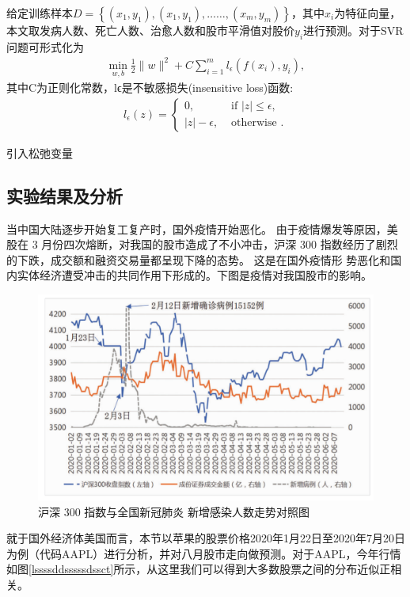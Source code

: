 \documentclass{whutmod}
\begin{document}
		给定训练样本$D=\left\{\left(x_{1}, y_{1}\right),\left(x_{1}, y_{1}\right), \ldots \ldots,\left(x_{m}, y_{m}\right)\right\}
		$，其中$x_i$为特征向量，本文取发病人数、死亡人数、治愈人数和股市平滑值对股价$y_i$进行预测。对于SVR问题可形式化为
				\begin{gather}
\min _{w, b} \frac{1}{2}\|w\|^{2}+C \sum_{i=1}^{m} l_{\epsilon}\left(f\left(x_{i}\right), y_{i}\right),
		\end{gather}
		其中C为正则化常数，lϵ是不敏感损失(insensitive loss)函数:
				\begin{gather*}
l_{\epsilon}(z)=\left\{\begin{array}{cc}
0, & \text { if }|z| \leq \epsilon ,\\
|z|-\epsilon, & \text { otherwise }.
\end{array}\right.
\end{gather*}

引入松弛变量
        \subsection{实验结果及分析}
        
        当中国大陆逐步开始复工复产时，国外疫情开始恶化。 由于疫情爆发等原因，美股在 3 月份四次熔断，对我国的股市造成了不小冲击，沪深 300 指数经历了剧烈的下跌，成交额和融资交易量都呈现下降的态势。 这是在国外疫情形
        势恶化和国内实体经济遭受冲击的共同作用下形成的。下图是疫情对我国股市的影响。
        \begin{figure}[H]
        	\centering
        	\includegraphics[width=.8\textwidth]{figures/A6.png}
        	\caption{沪深 300 指数与全国新冠肺炎
        		新增感染人数走势对照图}
        \end{figure}
        
        
       就于国外经济体美国而言，本节以苹果的股票价格2020年1月22日至2020年7月20日为例（代码AAPL）进行分析，并对八月股市走向做预测。对于AAPL，今年行情如图\ref{lssssddsssssdssct}所示，从这里我们可以得到大多数股票之间的分布近似正相关。
   
\end{document}
